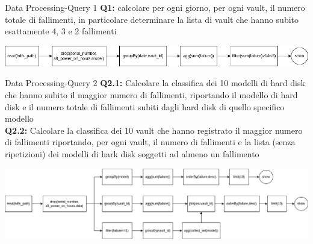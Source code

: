 \documentclass[13pt,aspectratio=169,t,xcolor=table]{beamer}
\begin{document}
\begin{frame}{Data Processing-Query 1}
    \textbf{Q1:} calcolare per ogni giorno, per ogni vault, il numero totale di fallimenti, in particolare determinare la lista di vault che hanno subito esattamente 4, 3 e 2 fallimenti
    \begin{adjustbox}{margin=0cm 0cm 0cm 2cm, center}
        \includegraphics[width=1\textwidth]{res/query1_dag.png}
    \end{adjustbox}
\end{frame}

\begin{frame}{Data Processing-Query 2}
    \textbf{Q2.1:} 
    Calcolare la classifica dei 10 modelli di hard disk che hanno subito il maggior numero di fallimenti, riportando il modello di hard disk e il numero totale di fallimenti subiti dagli hard disk di quello specifico modello\\ 
    \vspace{0.2cm}
    \textbf{Q2.2:} 
    Calcolare la classifica dei 10 vault che hanno registrato il maggior numero di fallimenti riportando, per ogni vault, il numero di fallimenti e la lista (senza ripetizioni) dei modelli di hark disk soggetti ad almeno un fallimento
    \begin{adjustbox}{margin=0cm 0cm 0cm 0.5cm, center}
        \includegraphics[width=1\textwidth]{res/query2_dag.png}
    \end{adjustbox}
\end{frame}
\end{document}

